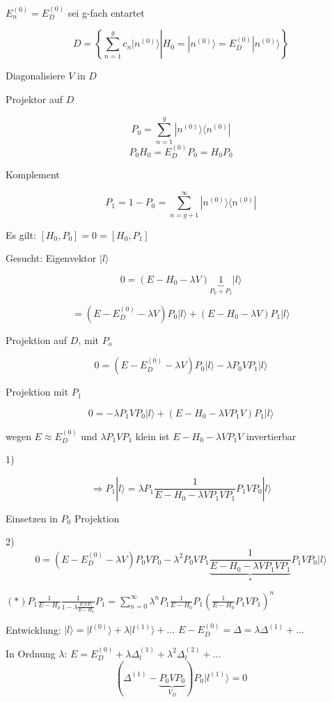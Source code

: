 \( E^{(0)}_n = E^{(0)}_D\) sei g-fach entartet

\[ D =  \left\{ \left. \sum^g_{n=1} c_n |n^{(0)}\rangle \right| H_0  =
  |n^{(0)}\rangle = E^{(0)}_D|n^{(0)}\rangle \right\}\]

Diagonalisiere \(V\) in \(D\)

Projektor auf \(D\)

\[ P_0 = \sum^g_{n=1} |n^{(0)}\rangle\langle n^{(0)}|\]
\[ P_0H_0 = E^{(0)}_D P_0 = H_0 P_0\]

Komplement

\[ P_1 = 1-P_0 = \sum^\infty_{n=g+1} |n^{(0)}\rangle\langle n^{(0)}|\]

Es gilt: \([H_0,P_0]=0=[H_0,P_1]\)

Gesucht: Eigenvektor \(|l\rangle\)

\[ 0 = (E-H_0-\lambda V)\underbrace{1}_{P_0+P_1} |l\rangle \]

\[ = (E-E^{(0)}_D-\lambda V)P_0 |l\rangle + (E-H_0-\lambda V)P_1
|l\rangle \]

Projektion auf \(D\), mit \(P_o\)

\[ 0=(E-E^{(0)}_D-\lambda V)P_0 |l\rangle -  \lambda P_0 V P_1 |l\rangle \]

Projektion mit \(P_1\)

\[ 0= -  \lambda P_1 V P_0 |l\rangle +  (E-H_0-\lambda V P_1 V)P_1
|l\rangle\]

wegen \(E\approx E^{(0)}_D\) und \(\lambda P_1VP_1\) klein ist \(E-H_0-\lambda V P_1 V\) invertierbar

1)

\[\Rightarrow P_1|l\rangle = \lambda P_1 \frac 1 {E-H_0-\lambda V P_1
  V P_1} P_1 V P_0 |l\rangle\]

Einsetzen in \(P_0\) Projektion

2)
\[ 0=(E-E^{(0)}_D-\lambda V)P_0 V P_0 - \lambda^2 P_0 VP_1
\underbrace{\frac {1} {E-H_0-\lambda V P_1 V P_1}}_{*} P_1 V P_0 |l\rangle\]

\((*) P_1\frac 1{E-H_0}\frac 1 {1-\lambda\frac{P_1VP_1}{E-H_0}}P_1= \sum^\infty_{n=0}\lambda^n P_1\frac 1 {E-H_0} P_1(\frac 1 {E-H_0} P_1VP_1)^n \)

 

Entwicklung: \(|l\rangle =|l^{(0)}\rangle +\lambda|l^{(1)}\rangle +...\) \(E-E^{(0)}_D = \Delta = \lambda\Delta^{(1)}+...\)

In Ordnung \(\lambda\): \(E=E^{(0)}_D+\lambda\Delta^{(1)}_l + \lambda^2\Delta^{(2)}_l+...\)
\[ (\Delta^{(1)}-\underbrace{P_0VP_0}_{V_D})P_0|l^{(1)}\rangle = 0\]

